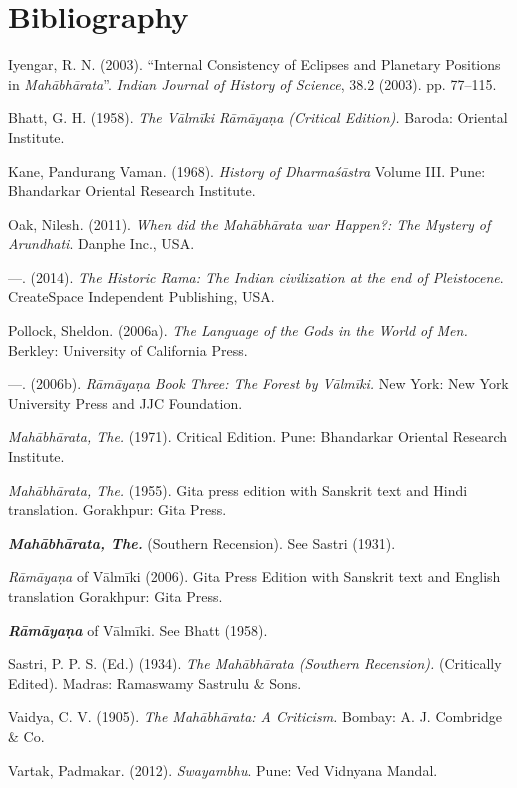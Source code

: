 \section*{Bibliography}

\begin{thebibliography}{99}
\itemsep=1pt
 Iyengar, R. N. (2003). “Internal Consistency of Eclipses and Planetary Positions in \textit{Mahābhārata}”. \textit{Indian Journal of History of Science}, 38.2 (2003). pp. 77--115.

  Bhatt, G. H. (1958). \textit{The Vālmīki Rāmāyaṇa (Critical Edition).} Baroda: Oriental Institute.

  Kane, Pandurang Vaman. (1968). \textit{History of Dharmaśāstra} Volume III. Pune: Bhandarkar Oriental Research Institute.

  Oak, Nilesh. (2011). \textit{When did the Mahābhārata war Happen?: The Mystery of Arundhati}. Danphe Inc., USA.

  —. (2014). \textit{The Historic Rama: The Indian civilization at the end of Pleistocene}. CreateSpace Independent Publishing, USA.

  Pollock, Sheldon. (2006a). \textit{The Language of the Gods in the World of Men.} Berkley: University of California Press.

  —. (2006b). \textit{Rāmāyaṇa} \textit{Book Three: The Forest by Vālmīki.} New York: New York University Press and JJC Foundation.

  \textit{Mahābhārata, The.} (1971). Critical Edition. Pune: Bhandarkar Oriental Research Institute.

  \textit{Mahābhārata, The.} (1955). Gita press edition with Sanskrit text and Hindi translation. Gorakhpur: Gita Press.

  \textbf{\textit{Mahābhārata, The.}} (Southern Recension). See Sastri (1931).

  \textit{Rāmāyaṇa} of Vālmīki (2006). Gita Press Edition with Sanskrit text and English translation Gorakhpur: Gita Press.

  \textbf{\textit{Rāmāyaṇa}} of Vālmīki. See Bhatt (1958).

  Sastri, P. P. S. (Ed.) (1934). \textit{The Mahābhārata (Southern Recension).} (Critically Edited). Madras: Ramaswamy Sastrulu \& Sons.

  Vaidya, C. V. (1905). \textit{The Mahābhārata: A Criticism.} Bombay: A. J. Combridge \& Co.

  Vartak, Padmakar. (2012). \textit{Swayambhu}. Pune: Ved Vidnyana Mandal.

 \end{thebibliography}

